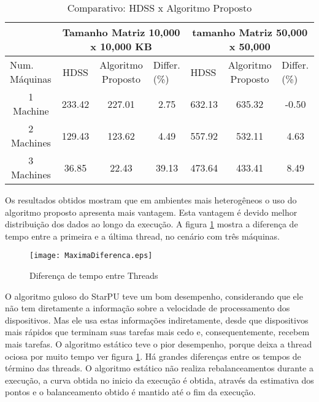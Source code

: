 \begin{table}[h]
\centering
\tiny
\caption{Comparativo: HDSS x Algoritmo Proposto}

\begin{tabular}{c|c|c|c|c|c|c|}
\cline{2-7}
\multicolumn{1}{l|}{}                 & \multicolumn{3}{c|}{Tamanho Matriz 10,000 x 10,000 KB}                     & \multicolumn{3}{c|}{tamanho Matriz 50,000 x 50,000 }                                       \\ \hline
\multicolumn{1}{|l|}{Num. Máquinas} & HDSS   & Algoritmo Proposto& \multicolumn{1}{l|}{Differ. (\%)} & \multicolumn{1}{l|}{HDSS} & Algoritmo Proposto& \multicolumn{1}{l|}{Differ. (\%)} \\ \hline
\multicolumn{1}{|c|}{1 Machine}       & 233.42 & 227.01        & 2.75                                 & 632.13                    & 635.32        & -0.50                                \\ \hline
\multicolumn{1}{|c|}{2 Machines}      & 129.43 & 123.62        & 4.49                                 & 557.92                    & 532.11        & 4.63                                 \\ \hline
\multicolumn{1}{|c|}{3 Machines}      & 36.85  & 22.43         & 39.13                                & 473.64                    & 433.41        &            8.49                          \\ \hline
\end{tabular}
\label{table: comparativo}
\end{table}

Os resultados obtidos mostram que em ambientes mais heterogêneos o uso do algoritmo proposto apresenta mais vantagem. Esta vantagem é devido melhor distribuição dos dados ao longo da execução. A figura \ref{fig:diferencaThreads} mostra a diferença de tempo entre a primeira e a última thread, no cenário com três máquinas.

\begin{figure}[htb]
	\begin{center}
	\centering
			\texttt{[image: MaximaDiferenca.eps]}
	\caption{Diferença de tempo entre Threads}
	\label{fig:diferencaThreads}
	\end{center}
\end{figure}

O algoritmo guloso do StarPU teve um bom desempenho, considerando que ele não tem diretamente a informação sobre a velocidade de processamento dos dispositivos. Mas ele usa estas informações indiretamente, desde que dispositivos mais rápidos que terminam suas tarefas mais cedo e, consequentemente, recebem mais tarefas. O algoritmo estático teve o pior desempenho, porque deixa a thread ociosa por muito tempo ver figura \ref{fig:diferencaThreads}. Há grandes diferenças entre os tempos de término das threads. O algoritmo estático não realiza rebalanceamentos durante a execução, a curva obtida no inicio da execução é obtida, através da estimativa dos pontos e o balanceamento obtido é mantido até o fim da execução.


